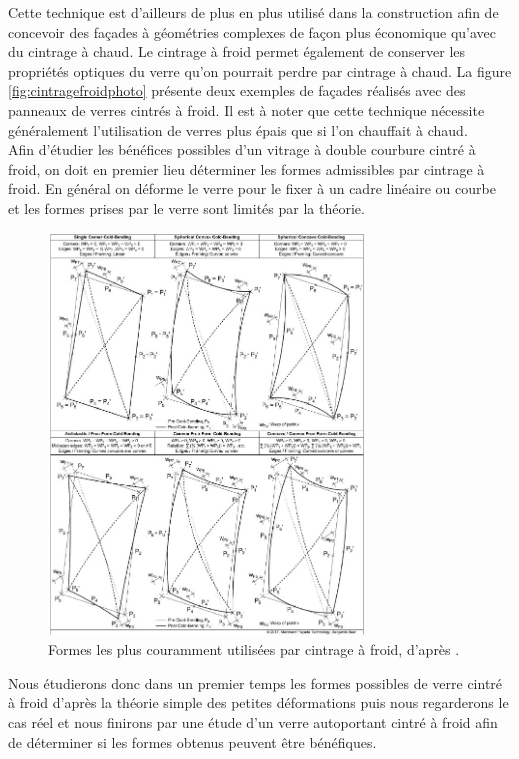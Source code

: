 \documentclass[11pt,titlepage]{article}
\begin{document}
Cette technique est d'ailleurs de plus en plus utilisé dans la construction afin de concevoir des façades à géométries complexes de façon plus économique qu'avec du cintrage à chaud. Le cintrage à froid permet également de conserver les propriétés optiques du verre qu'on pourrait perdre par cintrage à chaud. La figure \ref{fig:cintragefroidphoto} présente deux exemples de façades réalisés avec des panneaux de verres cintrés à froid. Il est à noter que cette technique nécessite généralement l'utilisation de verres plus épais que si l'on chauffait à chaud.
\\

Afin d'étudier les bénéfices possibles d'un vitrage à double courbure cintré à froid, on doit en premier lieu déterminer les formes admissibles par cintrage à froid. En général on déforme le verre pour le fixer à un cadre linéaire ou courbe et les formes prises par le verre sont limités par la théorie.
\begin{figure}[H]
    \centering
    \includegraphics[width=0.75\textwidth]{img/cintrage_froid/fig4_74.jpg}
    \caption{Formes les plus couramment utilisées par cintrage à froid, d'après \Textcite{meinhardt}.}
    \label{fig:cintragefroidtypes}
\end{figure}

Nous étudierons donc dans un premier temps les formes possibles de verre cintré à froid d'après la théorie simple des petites déformations puis nous regarderons le cas réel et nous finirons par une étude d'un verre autoportant cintré à froid afin de déterminer si les formes obtenus peuvent être bénéfiques.
\end{document}
